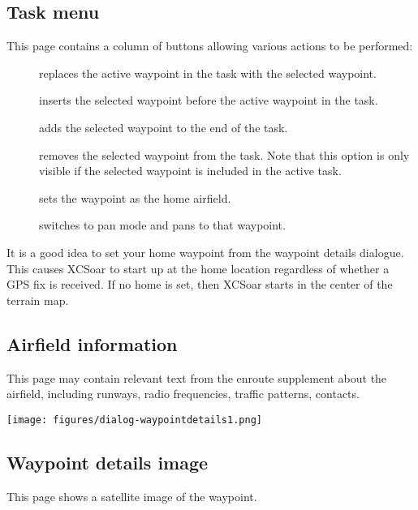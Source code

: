 \subsection*{Task menu}  
This page contains a column of buttons allowing various actions to be performed:
\begin{description}
\item[] replaces the active waypoint in the task with 
  the selected waypoint.
\item[] inserts the selected waypoint before the active 
  waypoint in
  the task.
\item[] adds the selected waypoint to the end of the task.
\item[] removes the selected waypoint from the task.  
  Note that this option is only visible if the selected waypoint is included in 
  the active task.
\item[] sets the waypoint as the home airfield.
\item[] switches to pan mode and pans to that waypoint.
\end{description}

It is a good idea to set your home waypoint from the waypoint details
dialogue. This causes XCSoar to start up at the home location regardless
of whether a GPS fix is received.  If no home is set, then XCSoar
starts in the center of the terrain map.

\subsection*{Airfield information}
This page may contain relevant text from the enroute supplement about
the airfield, including runways, radio frequencies, traffic patterns,
contacts.
\begin{center}
\texttt{[image: figures/dialog-waypointdetails1.png]}
\end{center}

\subsection*{Waypoint details image}
This page shows a satellite image of the waypoint.


